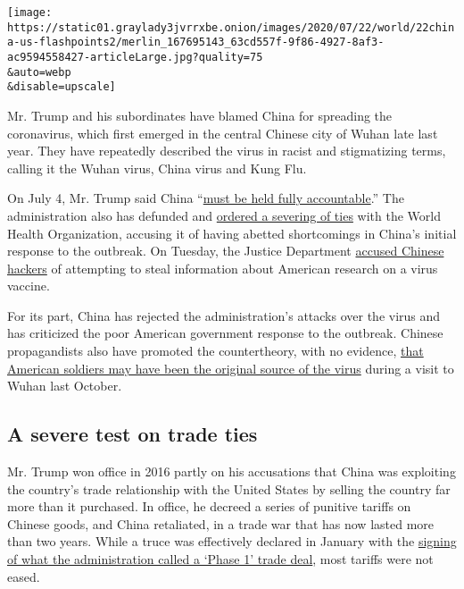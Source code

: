 \texttt{[image: https://static01.graylady3jvrrxbe.onion/images/2020/07/22/world/22china-us-flashpoints2/merlin\_167695143\_63cd557f-9f86-4927-8af3-ac9594558427-articleLarge.jpg?quality=75\\\&auto=webp\\\&disable=upscale]}

Mr. Trump and his subordinates have blamed China for spreading the
coronavirus, which first emerged in the central Chinese city of Wuhan
late last year. They have repeatedly described the virus in racist and
stigmatizing terms, calling it the Wuhan virus, China virus and Kung
Flu.

On July 4, Mr. Trump said China
``\href{https://www.youtube.com/watch?v=FDZtbUpK6zM}{must be held fully
accountable}.'' The administration also has defunded and
\href{https://www.nytimes3xbfgragh.onion/2020/07/07/us/politics/coronavirus-trump-who.html?searchResultPosition=2}{ordered
a severing of ties} with the World Health Organization, accusing it of
having abetted shortcomings in China's initial response to the outbreak.
On Tuesday, the Justice Department
\href{https://www.nytimes3xbfgragh.onion/2020/07/21/us/politics/china-hacking-coronavirus-vaccine.html}{accused
Chinese hackers} of attempting to steal information about American
research on a virus vaccine.

For its part, China has rejected the administration's attacks over the
virus and has criticized the poor American government response to the
outbreak. Chinese propagandists also have promoted the countertheory,
with no evidence,
\href{https://www.nytimes3xbfgragh.onion/2020/03/13/world/asia/coronavirus-china-conspiracy-theory.html}{that
American soldiers may have been the original source of the virus} during
a visit to Wuhan last October.

\hypertarget{a-severe-test-on-trade-ties}{%
\subsection{A severe test on trade
ties}\label{a-severe-test-on-trade-ties}}

Mr. Trump won office in 2016 partly on his accusations that China was
exploiting the country's trade relationship with the United States by
selling the country far more than it purchased. In office, he decreed a
series of punitive tariffs on Chinese goods, and China retaliated, in a
trade war that has now lasted more than two years. While a truce was
effectively declared in January with the
\href{https://ustr.gov/sites/default/files/files/agreements/phase\%20one\%20agreement/Economic_And_Trade_Agreement_Between_The_United_States_And_China_Text.pdf}{signing
of what the administration called a `Phase 1' trade deal}, most tariffs
were not eased.

